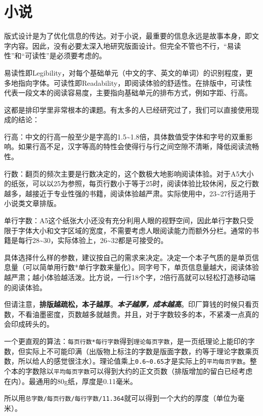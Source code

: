 \documentclass[10pt,openany]{book}
\begin{document}
\begin{sloppypar}
    \section{小说}

    版式设计是为了优化信息的传达。对于小说，最重要的信息永远是故事本身，即文字内容。因此，没有必要太深入地研究版面设计。但完全不管也不行，“易读性”和“可读性”是必须要考虑的。

    易读性即Legibility，对每个基础单元（中文的字、英文的单词）的识别程度，更多地指向字体。可读性即Readability，即阅读体验的舒适性。在排版中，可读性代表一段文本的阅读容易度，主要指向基础单元的排布方式，例如字距、行高。

    这都是排印学里非常根本的课题。有太多的人已经研究过了，我们可以直接使用现成的结论：

    行高：中文的行高一般至少是字高的1.5\textasciitilde1.8倍，具体数值受字体和字号的双重影响。如果行高不足，汉字等高的特性会使得行与行之间空隙不清晰，降低阅读流畅性。

    行数：翻页的频次主要是行数决定的，这个数极大地影响阅读体验。对于A5大小的纸张，可以以25为参照，每页行数小于等于25时，阅读体验比较休闲，反之行数越多，越接近于专业性强的书籍，阅读体验越严肃。实际使用中，23\textasciitilde27行适用于小说类文章排版。

    单行字数：A5这个纸张大小还没有充分利用人眼的视野空间，因此单行字数只受限于字体大小和文字区域的宽度，不需要考虑人眼阅读能力而额外分栏。通常的书籍是每行28\textasciitilde30，实际体验上，26\textasciitilde32都是可接受的。

    \blankpar

    具体选择什么样的参数，建议按自己的需求来决定。决定一个本子气质的是单页信息量（可以简单用行数*单行字数来量化）。同字号下，单页信息量越大，阅读体验越严肃；越小体验越活泼。比方说，一行18个字，2倍行高就可以轻松打造移动端的阅读体验。

    但请注意，\textbf{排版越疏松，本子越厚}。\textbf{\emph{本子越厚，成本越高}}。印厂算钱的时候只看页数，不看油墨密度，页数越多就越贵。并且，对于字数较多的本，不紧凑一点真的会印成砖头的。

    一个更直观的算法：\texttt{每页行数*每行字数}得到\texttt{理论每页字数}，是一页纸理论上能印的字数，但实际上不可能印满（出版物上标注的字数是版面字数，约等于理论字数乘页数，所以给人的感觉很注水）。理论值乘上\texttt{0.6\textasciitilde{}0.65}才是实际上的\texttt{平均每页字数}。整个本的字数除以\texttt{平均每页字数}可以得到大约的正文页数（排版增加的留白已经考虑在内）。最通用的80g纸，厚度是0.11毫米。

    所以用\texttt{总字数/每页行数/每行字数/11.364}就可以得到一个大约的厚度（单位为毫米）。


\end{sloppypar}
\end{document}
